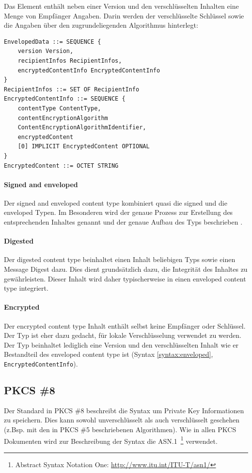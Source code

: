 \documentclass[10pt,a4paper]{article}
\begin{document}
Das Element enthält neben einer Version und den verschlüsselten Inhalten eine Menge von
Empfänger Angaben. Darin werden der verschlüsselte Schlüssel sowie die Angaben über den
zugrundeliegenden Algorithmus hinterlegt:
\begin{verbatim}
EnvelopedData ::= SEQUENCE {
    version Version,
    recipientInfos RecipientInfos,
    encryptedContentInfo EncryptedContentInfo
}
RecipientInfos ::= SET OF RecipientInfo
EncryptedContentInfo ::= SEQUENCE {
    contentType ContentType,
    contentEncryptionAlgorithm
    ContentEncryptionAlgorithmIdentifier,
    encryptedContent
    [0] IMPLICIT EncryptedContent OPTIONAL
}
EncryptedContent ::= OCTET STRING
\end{verbatim}
\label{syntax:enveloped}

\paragraph{Signed and enveloped}
Der signed and enveloped content type kombiniert quasi die signed und die enveloped Typen.
Im Besonderen wird der genaue Prozess zur Erstellung des entsprechenden Inhaltes genannt
\cite[S.22]{pkcs7} und der genaue Aufbau des Typs beschrieben \cite[S.23]{pkcs7}.

\paragraph{Digested}
Der digested content type beinhaltet einen Inhalt beliebigen Typs sowie einen Message
Digest dazu. Dies dient grundsätzlich dazu, die Integrität des Inhaltes zu gewährleisten.
Dieser Inhalt wird daher typischerweise in einen enveloped content type integriert.

\paragraph{Encrypted}
Der encrypted content type Inhalt enthält selbst keine Empfänger oder Schlüssel. Der Typ
ist eher dazu gedacht, für lokale Verschlüsselung verwendet zu werden. Der Typ beinhaltet
lediglich eine Version und den verschlüsselten Inhalt wie er Bestandteil des enveloped
content type ist (Syntax \ref{syntax:enveloped}, \texttt{EncryptedContentInfo}).

\subsection{PKCS \#8}
Der Standard in PKCS \#8 beschreibt die Syntax um Private Key Informationen zu speichern.
Dies kann sowohl unverschlüsselt als auch verschlüsselt geschehen (z.Bsp. mit den in PKCS
\#5 beschriebenen Algorithmen). Wie in allen PKCS Dokumenten wird zur Beschreibung der
Syntax die ASN.1~\footnote{Abstract Syntax Notation One:
\url{http://www.itu.int/ITU-T/asn1/}} verwendet.
\end{document}
